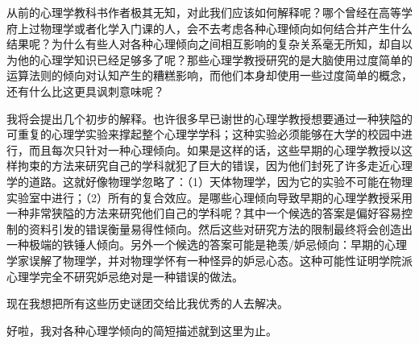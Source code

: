 从前的心理学教科书作者极其无知，对此我们应该如何解释呢？哪个曾经在高等学府上过物理学或者化学入门课的人，会不去考虑各种心理倾向如何结合并产生什么结果呢？为什么有些人对各种心理倾向之间相互影响的复杂关系毫无所知，却自以为他的心理学知识已经足够多了呢？那些心理学教授研究的是大脑使用过度简单的运算法则的倾向对认知产生的糟糕影响，而他们本身却使用一些过度简单的概念，还有什么比这更具讽刺意味呢？
\par

我将会提出几个初步的解释。也许很多早已谢世的心理学教授想要通过一种狭隘的可重复的心理学实验来撑起整个心理学学科；这种实验必须能够在大学的校园中进行，而且每次只针对一种心理倾向。如果是这样的话，这些早期的心理学教授以这样拘束的方法来研究自己的学科就犯了巨大的错误，因为他们封死了许多走近心理学的道路。这就好像物理学忽略了：（1）天体物理学，因为它的实验不可能在物理实验室中进行；（2）所有的复合效应。是哪些心理倾向导致早期的心理学教授采用一种非常狭隘的方法来研究他们自己的学科呢？其中一个候选的答案是偏好容易控制的资料引发的错误衡量易得性倾向。然后这些对研究方法的限制最终将会创造出一种极端的铁锤人倾向。另外一个候选的答案可能是艳羡/妒忌倾向：早期的心理学家误解了物理学，并对物理学怀有一种怪异的妒忌心态。这种可能性证明学院派心理学完全不研究妒忌绝对是一种错误的做法。
\par

现在我想把所有这些历史谜团交给比我优秀的人去解决。
\par

好啦，我对各种心理学倾向的简短描述就到这里为止。
\par
